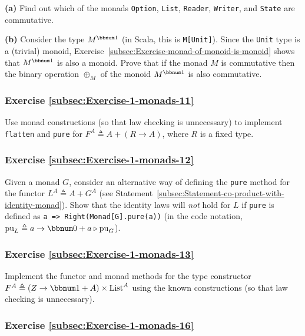 \noindent \vspace{0\baselineskip}

\textbf{(a)} Find out which of the monads \lstinline!Option!, \lstinline!List!,
\lstinline!Reader!, \lstinline!Writer!, and \lstinline!State! are
commutative.

\textbf{(b)} Consider the type $M^{\bbnum 1}$ (in Scala, this is
\lstinline!M[Unit]!). Since the \lstinline!Unit! type is a (trivial)
monoid, Exercise~\ref{subsec:Exercise-monad-of-monoid-is-monoid}
shows that $M^{\bbnum 1}$ is also a monoid. Prove that if the monad
$M$ is commutative then the binary operation $\oplus_{M}$ of the
monoid $M^{\bbnum 1}$ is also commutative.

\subsubsection{Exercise \label{subsec:Exercise-1-monads-11}\ref{subsec:Exercise-1-monads-11}}

Use monad constructions (so that law checking is unnecessary) to implement
\lstinline!flatten! and \lstinline!pure! for $F^{A}\triangleq A+\left(R\rightarrow A\right)$,
where $R$ is a fixed type.

\subsubsection{Exercise \label{subsec:Exercise-1-monads-12}\ref{subsec:Exercise-1-monads-12}}

Given a monad $G$, consider an alternative way of defining the \lstinline!pure!
method for the functor $L^{A}\triangleq A+G^{A}$ (see Statement~\ref{subsec:Statement-co-product-with-identity-monad}).
Show that the identity laws will \emph{not} hold for $L$ if \lstinline!pure!
is defined as \lstinline!a => Right(Monad[G].pure(a))! (in the code
notation, $\text{pu}_{L}\triangleq a\rightarrow\bbnum 0+a\triangleright\text{pu}_{G}$).

\subsubsection{Exercise \label{subsec:Exercise-1-monads-13}\ref{subsec:Exercise-1-monads-13}}

Implement the functor and monad methods for the type constructor $F^{A}\triangleq\left(Z\rightarrow\bbnum 1+A\right)\times\text{List}^{A}$
using the known constructions (so that law checking is unnecessary).

\subsubsection{Exercise \label{subsec:Exercise-1-monads-16}\ref{subsec:Exercise-1-monads-16}}

